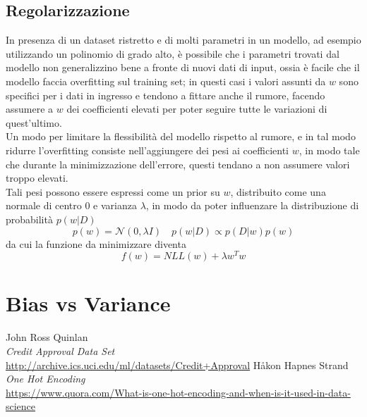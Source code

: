 \documentclass[a4paper,8pt]{article}
\begin{document}
\begin{multicols}{2}
\subsection{Regolarizzazione}
In presenza di un dataset ristretto e di molti parametri in un modello, ad esempio utilizzando un polinomio di grado alto, è possibile che i parametri trovati dal modello non generalizzino bene a fronte di nuovi dati di input, ossia è facile che il modello faccia overfitting sul training set; in questi casi i valori assunti da $w$ sono specifici per i dati in ingresso e tendono a fittare anche il rumore, facendo assumere a $w$ dei coefficienti elevati per poter seguire tutte le variazioni di quest'ultimo.\\
Un modo per limitare la flessibilità del modello rispetto al rumore, e in tal modo ridurre l'overfitting consiste nell'aggiungere dei pesi ai coefficienti $w$, in modo tale che durante la minimizzazione dell'errore, questi tendano a non assumere valori troppo elevati.\\
Tali pesi possono essere espressi come un prior su $w$, distribuito come una normale di centro 0 e varianza $\lambda$, in modo da poter influenzare la distribuzione di probabilità $p(w|D)$
\begin{equation}
p(w) = \mathcal{N}(0, \lambda I) \quad p(w|D) \propto p(D|w)p(w)
\end{equation}
da cui la funzione da minimizzare diventa
\begin{equation}
f(w) = NLL(w) + \lambda w^Tw
\end{equation}
\section{Bias vs Variance}

\end{multicols}

\begin{thebibliography}{10}
	John Ross Quinlan \\
	\emph{Credit Approval Data Set} \\
	\url{http://archive.ics.uci.edu/ml/datasets/Credit+Approval}
	Håkon Hapnes Strand \\
	\emph{One Hot Encoding} \\
	\url{https://www.quora.com/What-is-one-hot-encoding-and-when-is-it-used-in-data-science}
	
\end{thebibliography}

\begin{equation}
\end{equation}
\end{document}
